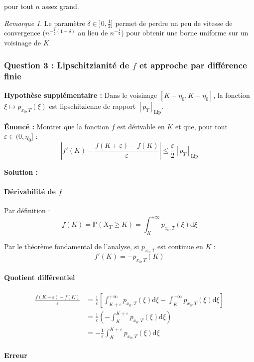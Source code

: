 \documentclass[12pt,a4paper]{article}
\theoremstyle{definition}
\theoremstyle{remark}
\newtheorem*{remark}{Remarque}
\newcommand{\Prob}{\mathbb{P}}
\newcommand{\dd}{\mathrm{d}}
\begin{document}
pour tout $n$ assez grand.

\begin{remark}
Le paramètre $\delta \in ]0, \frac{1}{2}]$ permet de perdre un peu de vitesse de convergence ($n^{-\frac{1}{2}(1-\delta)}$ au lieu de $n^{-\frac{1}{2}}$) pour obtenir une borne uniforme sur un voisinage de $K$.
\end{remark}

\subsubsection{Question 3 : Lipschitzianité de $f$ et approche par différence finie}

\textbf{Hypothèse supplémentaire :} Dans le voisinage $[K - \eta_0, K + \eta_0]$, la fonction $\xi \mapsto p_{x_0,T}(\xi)$ est lipschitzienne de rapport $[p_T]_{\text{Lip}}$.

\textbf{Énoncé :} Montrer que la fonction $f$ est dérivable en $K$ et que, pour tout $\varepsilon \in (0, \eta_0]$ :
\[
\left|f'(K) - \frac{f(K+\varepsilon) - f(K)}{\varepsilon}\right| \leq \frac{\varepsilon}{2}[p_T]_{\text{Lip}}
\]

\textbf{Solution :}

\paragraph{Dérivabilité de $f$}

Par définition :
\[
f(K) = \Prob(X_T \geq K) = \int_K^{+\infty} p_{x_0,T}(\xi)\dd\xi
\]

Par le théorème fondamental de l'analyse, si $p_{x_0,T}$ est continue en $K$ :
\[
f'(K) = -p_{x_0,T}(K)
\]

\paragraph{Quotient différentiel}

\begin{align*}
\frac{f(K+\varepsilon) - f(K)}{\varepsilon} &= \frac{1}{\varepsilon}\left[\int_{K+\varepsilon}^{+\infty} p_{x_0,T}(\xi)\dd\xi - \int_K^{+\infty} p_{x_0,T}(\xi)\dd\xi\right] \\
&= \frac{1}{\varepsilon}\left(-\int_K^{K+\varepsilon} p_{x_0,T}(\xi)\dd\xi\right) \\
&= -\frac{1}{\varepsilon}\int_K^{K+\varepsilon} p_{x_0,T}(\xi)\dd\xi
\end{align*}

\paragraph{Erreur}
\end{document}
